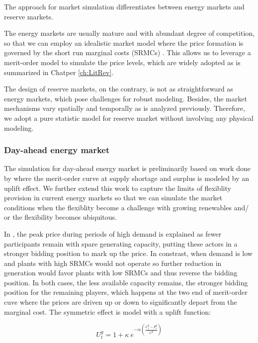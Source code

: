 The approach for market simulation differentiates between energy markets and reserve markets. 

The energy markets are usually mature and with abundant degree of competition, so that we can employ an idealistic market model where the price formation is governed by the short run marginal costs (SRMCs) \cite{Grunewald2012} \cite{Grunewald2012a}. This allows us to leverage a merit-order model to simulate the price levels, which are widely adopted as is summarized in Chatper \ref{ch:LitRev}. 

The design of reserve markets, on the contrary,  is not as straightforward as energy markets, which pose challenges for robust modeling. Besides, the market mechanisms vary spatially and temporally as is analyzed previously. Therefore, we adopt a pure statistic model for reserve market without involving any physical modeling.

\subsubsection{Day-ahead energy market}

The simulation for day-ahead energy market is preliminarily based on work done by \cite{Grunewald2012a} where the merit-order curve at supply shortage and surplus is modeled by an uplift effect. We further extend this work to capture the limits of flexiblity provision in current energy markets so that we can simulate the market conditions when the flexiblity become a challenge with growing renewables and/ or the flexibility becomes ubiquitous.

In \cite{Grunewald2012a}, the peak price during periods of high demand is explained as fewer participants remain with spare generating capacity, putting these actors in a stronger bidding position to mark up the price. In constrast, when demand is low and plants with high SRMCs would not operate so further reduction in generation would favor plants with low SRMCs and thus reverse the bidding position. In both cases, the less available capacity remains, the stronger bidding position for the remaining players, which happens at the two end of merit-order cuve where the prices are driven up or down to significantly depart from the marginal cost. The symmetric effect is model with a uplift function:

\begin{equation}
U_t^g = 1 + \kappa~e^{-\alpha\left(\frac{C_t^g -P^g_t }{C^g}\right)}
\end{equation}

